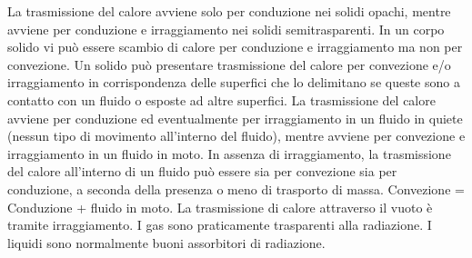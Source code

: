 La trasmissione del calore avviene solo per conduzione nei solidi
opachi, mentre avviene per conduzione e irraggiamento nei solidi
semitrasparenti. In un corpo solido vi può essere scambio di calore per
conduzione e irraggiamento ma non per convezione. Un solido può
presentare trasmissione del calore per convezione e/o irraggiamento in
corrispondenza delle superfici che lo delimitano se queste sono a
contatto con un fluido o esposte ad altre superfici. La trasmissione del
calore avviene per conduzione ed eventualmente per irraggiamento in un
fluido in quiete (nessun tipo di movimento all'interno del fluido),
mentre avviene per convezione e irraggiamento in un fluido in moto. In
assenza di irraggiamento, la trasmissione del calore all'interno di un
fluido può essere sia per convezione sia per conduzione, a seconda della
presenza o meno di trasporto di massa. Convezione = Conduzione + fluido
in moto. La trasmissione di calore attraverso il vuoto è tramite
irraggiamento. I gas sono praticamente trasparenti alla radiazione. I
liquidi sono normalmente buoni assorbitori di radiazione.
